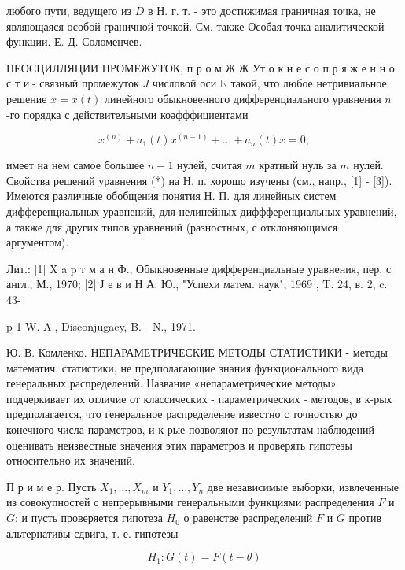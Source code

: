 \documentclass[10pt]{article}
\begin{document}
любого пути, ведущего из $D$ в Н. г. т. - это достижимая граничная точка, не являющаяся особой граничной точкой. См. также Особая точка аналитической функции. Е. Д. Соломенчев.



НЕОСЦИЛЛЯЦИИ ПРОМЕЖУТОК, п р о м Ж Ж Ут о к н е с о п р я ж е н н о с т и,- связный промежуток $J$ числовой оси $\mathbb{R}$ такой, что любое нетривиальное решение $x=x(t)$ линейного обыкновенного дифференциального уравнения $n$-го порядка с действительными коәфффициентами



\[

x^{(n)}+a_{1}(t) x^{(n-1)}+\ldots+a_{n}(t) x=0,

\]



имеет на нем самое большее $n-1$ нулей, считая $m$ кратный нуль за $m$ нулей. Свойства решений уравнения (*) на Н. п. хорошо изучены (см., напр., [1] - [3]). Имеются различные обобщения понятия Н. П. для линейных систем дифференциальных уравнений, для нелинейных диффференциальных уравнений, а также для других типов уравнений (разностных, с отклоняющимся аргументом).



Лит.: [1] X a p т м а н Ф., Обыкновенные дифференциальные уравнения, пер. с англ., М., 1970; [2] Ј е в и Н А. Ю., "Успехи матем. наук", 1969 , T. 24, в. 2, c. 43-

p 1 W. A., Disconjugacy, B. - N., 1971.



Ю. В. Комленко. НЕПАРАМЕТРИЧЕСКИЕ МЕТОДЫ СТАТИСТИКИ - методы математич. статистики, не предполагающие знания функционального вида генеральных распределений. Название «непараметрические методы» подчеркивает их отличие от классических - параметрических - методов, в к-рых предполагается, что генеральное распределение известно с точностью до конечного числа параметров, и к-рые позволяют по результатам наблюдений оценивать неизвестные значения этих параметров и проверять гипотезы относительно их значений.



П р и м е р. Пусть $X_{1}, \ldots, X_{m}$ и $Y_{1}, \ldots, Y_{n}$ две независимые выборки, извлеченные из совокупностей с непрерывными генеральными функциями распределения $F$ и $G$; и пусть проверяется гипотеза $H_{0}$ о равенстве распределений $F$ и $G$ против альтернативы сдвига, т. е. гипотезы



\[

H_{1}: G(t)=F(t-\theta)

\]
\end{document}
